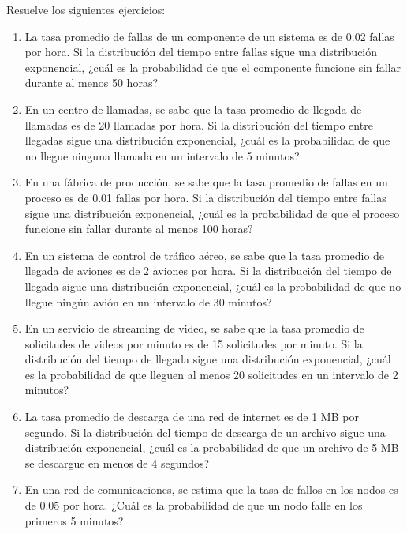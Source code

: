 \begin{Ejer}
Resuelve los siguientes ejercicios:
\begin{enumerate}

    \item La tasa promedio de fallas de un componente de un sistema es de 0.02 fallas por hora. Si la distribución del tiempo entre fallas sigue una distribución exponencial, ¿cuál es la probabilidad de que el componente funcione sin fallar durante al menos 50 horas?

    \item En un centro de llamadas, se sabe que la tasa promedio de llegada de llamadas es de 20 llamadas por hora. Si la distribución del tiempo entre llegadas sigue una distribución exponencial, ¿cuál es la probabilidad de que no llegue ninguna llamada en un intervalo de 5 minutos?

    \item En una fábrica de producción, se sabe que la tasa promedio de fallas en un proceso es de 0.01 fallas por hora. Si la distribución del tiempo entre fallas sigue una distribución exponencial, ¿cuál es la probabilidad de que el proceso funcione sin fallar durante al menos 100 horas?

    \item En un sistema de control de tráfico aéreo, se sabe que la tasa promedio de llegada de aviones es de 2 aviones por hora. Si la distribución del tiempo de llegada sigue una distribución exponencial, ¿cuál es la probabilidad de que no llegue ningún avión en un intervalo de 30 minutos?

    \item En un servicio de streaming de video, se sabe que la tasa promedio de solicitudes de videos por minuto es de 15 solicitudes por minuto. Si la distribución del tiempo de llegada sigue una distribución exponencial, ¿cuál es la probabilidad de que lleguen al menos 20 solicitudes en un intervalo de 2 minutos?

    \item La tasa promedio de descarga de una red de internet es de 1 MB por segundo. Si la distribución del tiempo de descarga de un archivo sigue una distribución exponencial, ¿cuál es la probabilidad de que un archivo de 5 MB se descargue en menos de 4 segundos?

    \item En una red de comunicaciones, se estima que la tasa de fallos en los nodos es de 0.05 por hora. ¿Cuál es la probabilidad de que un nodo falle en los primeros 5 minutos?


\end{enumerate}
\end{Ejer}
